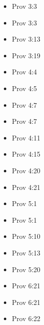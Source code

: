 \documentclass[14pt]{book}
\begin{document}
\begin{multicols}{2}
\begin{itemize}
									\item Prov 3:3
									
									\item Prov 3:3
									
									\item Prov 3:13
									
									\item Prov 3:19
									
									\item Prov 4:4
									
									\item Prov 4:5
									
									\item Prov 4:7
									
									\item Prov 4:7
									
									\item Prov 4:11
									
									\item Prov 4:15
									
									\item Prov 4:20
									
									\item Prov 4:21
									
									\item Prov 5:1
									
									\item Prov 5:1
									
									\item Prov 5:10
									
									\item Prov 5:13
									
									\item Prov 5:20
									
									\item Prov 6:21
									
									\item Prov 6:21
									
									\item Prov 6:22
									

\end{itemize}
\end{multicols}
\end{document}
